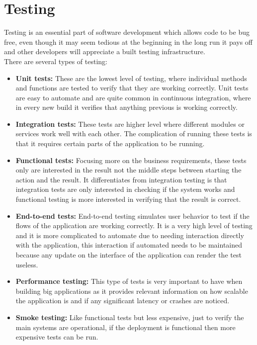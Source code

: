 \section{Testing}\label{sec:chap3_test}

Testing is an essential part of software development which allows code to be bug free, even though it may seem tedious at the beginning in the long run it pays off and other developers will appreciate a built testing infrastructure.\\
There are several types of testing:\cite{testing}

\begin{itemize}
	\item {\textbf{Unit tests:} These are the lowest level of testing, where individual methods and functions are tested to verify that they are working correctly. Unit tests are easy to automate and are quite common in continuous integration, where in every new build it verifies that anything previous is working correctly.}
	\item {\textbf{Integration tests:} These tests are higher level where different modules or services work well with each other. The complication of running these tests is that it requires certain parts of the application to be running.}
	\item {\textbf{Functional tests:} Focusing more on the business requirements, these tests only are interested in the result not the middle steps between starting the action and the result. It differentiates from integration testing is that integration tests are only interested in checking if the system works and functional testing is more interested in verifying that the result is correct.}
	\item {\textbf{End-to-end tests:} End-to-end testing simulates user behavior to test if the flows of the application are working correctly. It is a very high level of testing and it is more complicated to automate due to needing interaction directly with the application, this interaction if automated needs to be maintained because any update on the interface of the application can render the test useless.}
	\item {\textbf{Performance testing:} This type of tests is very important to have when building big applications as it provides relevant information on how scalable the application is and if any significant latency or crashes are noticed.}
	\item {\textbf{Smoke testing:} Like functional tests but less expensive, just to verify the main systems are operational, if the deployment is functional then more expensive tests can be run.}
\end{itemize}

